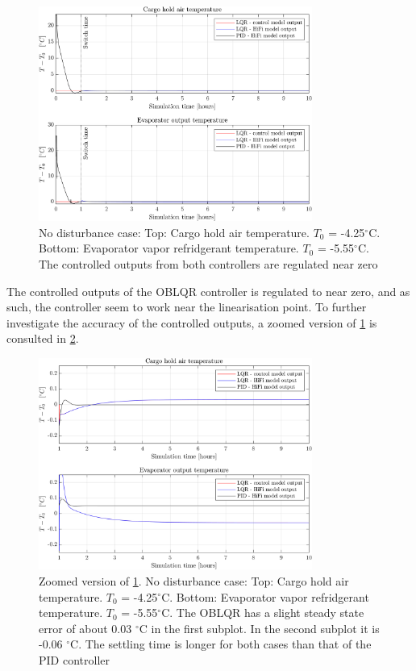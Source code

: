 \begin{figure}[H]
	\centering
	\includegraphics[width=0.8\textwidth]{Graphics/fig_LQRvsKresten_noDist.png}
	\caption{No disturbance case: Top: Cargo hold air temperature. $T_0$ = -4.25$^{\circ}$C. Bottom: Evaporator vapor refridgerant temperature. $T_0$ = -5.55$^{\circ}$C. The controlled outputs from both controllers are regulated near zero}
	\label{fig:LQR_wellTuned_noDist}
\end{figure} 
The controlled outputs of the OBLQR controller is regulated to near zero, and as such, the controller seem to work near the linearisation point. To further investigate the accuracy of the controlled outputs, a zoomed version of \cref{fig:LQR_wellTuned_noDist} is consulted in \cref{fig:LQR_wellTuned_noDist_zoom}.


\begin{figure}[H]
	\centering
	\includegraphics[width=0.8\textwidth]{Graphics/fig_LQRvsKresten_noDist_zoom.png}
	\caption{Zoomed version of \cref{fig:LQR_wellTuned_noDist}. No disturbance case: Top: Cargo hold air temperature. $T_0$ = -4.25$^{\circ}$C. Bottom: Evaporator vapor refridgerant temperature. $T_0$ = -5.55$^{\circ}$C. The OBLQR has a slight steady state error of about 0.03 $^{\circ}$C in the first subplot. In the second subplot it is -0.06 $^{\circ}$C. The settling time is longer for both cases than that of the PID controller}
	\label{fig:LQR_wellTuned_noDist_zoom}
\end{figure}

